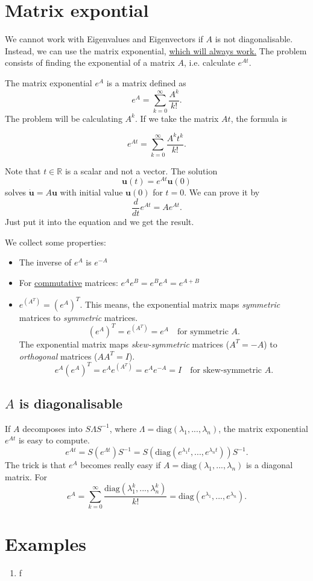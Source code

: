 \documentclass[a4paper, 11pt]{article}
\theoremstyle{plain}
\theoremstyle{definition}
\begin{document}
\section{Matrix expontial}
We cannot work with Eigenvalues and Eigenvectors if $A$ is not diagonalisable. Instead, we can use the matrix exponential, \underline{which will always work.} The problem consists of finding the exponential of a matrix $A$, i.e. calculate $e^{At}$.

The matrix exponential $e^{A}$ is a matrix defined as
\[
	e^{A} = \sum^{\infty}_{k=0} \frac{A^k}{k!}.
\]
The problem will be calculating $A^k$. If we take the matrix $At$, the formula is
\begin{framed}
\[
	e^{At} = \sum^{\infty}_{k=0} \frac{A^kt^k}{k!}.
\]
\end{framed}
Note that $t \in \mathbb R$ is a scalar and not a vector. The solution $$\mathbf u(t) = e^{At}\mathbf u(0)$$ solves $\mathbf{\dot u} = A \mathbf u$ with initial value $\mathbf u(0)$ for $t = 0$. We can prove it by
\[
	\frac{d}{dt}e^{At} = Ae^{At}.
\]
Just put it into the equation and we get the result.

We collect some properties:
\begin{itemize}
	\item The inverse of $e^{A}$ is $e^{-A}$
	\item For \underline{commutative} matrices: $e^{A}e^{B} = e^{B}e^{A} = e^{A+B}$
	\item $e^{(A^T)} = (e^{A})^T$. This means, the exponential matrix maps \emph{symmetric} matrices to \emph{symmetric} matrices.
	\[
		(e^{A})^T = e^{(A^T)} = e^{A} \quad \text{for symmetric $A$}.
	\]
	The exponential matrix maps \emph{skew-symmetric} matrices ($A^T = -A$) to \emph{orthogonal} matrices ($AA^T = I$). 
	\[
		e^{A}(e^{A})^T = e^{A}e^{(A^T)} = e^{A}e^{-A} = I \quad \text{for skew-symmetric $A$}.
	\]
\end{itemize}

\subsection{$A$ is diagonalisable}
If $A$ decomposes into $S \Lambda S^{-1}$, where $\Lambda = \mathrm{diag}(\lambda_1,...,\lambda_n)$, the matrix exponential $e^{At}$ is easy to compute.
\[
	e^{At} = S(e^{\Lambda t})S^{-1} = S\left (\mathrm{diag}(e^{\lambda_1t}, ..., e^{\lambda_n t})\right)S^{-1}.
\]
The trick is that $e^{A}$ becomes really easy if $A = \mathrm{diag}(\lambda_1,...,\lambda_n)$ is a diagonal matrix. For
\[
	e^{A} = \sum^{\infty}_{k = 0} \frac{\mathrm{diag}(\lambda_1^k,...,\lambda_n^k)}{k!} = \mathrm{diag}(e^{\lambda_1},..., e^{\lambda_n}).
\]

\section{Examples}
\begin{enumerate}
	\item f
\end{enumerate}
\end{document}
